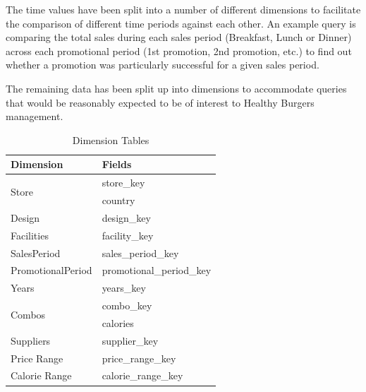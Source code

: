 \documentclass[11pt, a4paper]{article}
\begin{document}
The time values have been split into a number of different dimensions to facilitate the comparison of different time periods against each other. An example query is comparing the total sales during each sales period (Breakfast, Lunch or Dinner) across each promotional period (1st promotion, 2nd promotion, etc.) to find out whether a promotion was particularly successful for a given sales period.

The remaining data has been split up into dimensions to accommodate queries that would be reasonably expected to be of interest to Healthy Burgers management. 

\begin{table}
\begin{minipage}{0.6\textwidth}
\begin{tabular}{| p{} | p{} |}
\hline
	\textbf{Dimension} & \textbf{Fields} \\
	\hline

	\multirow{2}{.2\textwidth}{Store} & store\_key \\
	& country \\
	\hline

	Design & design\_key \\ 
	\hline

	Facilities & facility\_key \\
	\hline

	SalesPeriod & sales\_period\_key \\
	\hline

	PromotionalPeriod & promotional\_period\_key \\
	\hline

	Years & years\_key \\
	\hline

	\multirow{2}{.2\textwidth}{Combos} & combo\_key \\
	& calories \\
	\hline

	Suppliers & supplier\_key \\
	\hline

	Price Range & price\_range\_key \\
	\hline

	Calorie Range & calorie\_range\_key \\
	\hline

	\end{tabular}
	\caption{Dimension Tables}
	\label{tab:dimensions}
	

\end{minipage}
\end{table}
\end{document}
